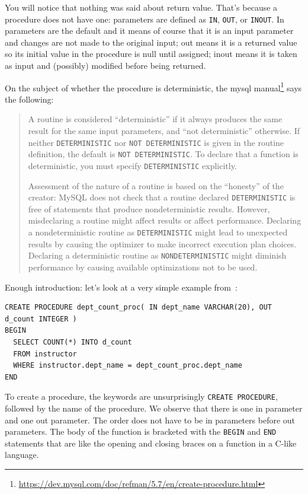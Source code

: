 You will notice that nothing was said about return value. That's because a procedure does not have one: parameters are defined as \texttt{IN}, \texttt{OUT}, or \texttt{INOUT}. In parameters are the default and it means of course that it is an input parameter and changes are not made to the original input; out means it is a returned value so its initial value in the procedure is null until assigned; inout means it is taken as input and (possibly) modified before being returned.

On the subject of whether the procedure is deterministic, the mysql manual\footnote{\url{https://dev.mysql.com/doc/refman/5.7/en/create-procedure.html}} says the following:

\begin{quote}
A routine is considered ``deterministic'' if it always produces the same result for the same input parameters, and ``not deterministic'' otherwise. If neither \texttt{DETERMINISTIC} nor \texttt{NOT DETERMINISTIC} is given in the routine definition, the default is \texttt{NOT DETERMINISTIC}. To declare that a function is deterministic, you must specify \texttt{DETERMINISTIC} explicitly.

Assessment of the nature of a routine is based on the ``honesty'' of the creator: MySQL does not check that a routine declared \texttt{DETERMINISTIC} is free of statements that produce nondeterministic results. However, misdeclaring a routine might affect results or affect performance. Declaring a nondeterministic routine as \texttt{DETERMINISTIC} might lead to unexpected results by causing the optimizer to make incorrect execution plan choices. Declaring a deterministic routine as \texttt{NONDETERMINISTIC} might diminish performance by causing available optimizations not to be used.
\end{quote}

Enough introduction: let's look at a very simple example from~\cite{dsc}:

{\small
\begin{verbatim}
CREATE PROCEDURE dept_count_proc( IN dept_name VARCHAR(20), OUT d_count INTEGER )
BEGIN
  SELECT COUNT(*) INTO d_count
  FROM instructor
  WHERE instructor.dept_name = dept_count_proc.dept_name
END
\end{verbatim}
}

To create a procedure, the keywords are unsurprisingly \texttt{CREATE PROCEDURE}, followed by the name of the procedure. We observe that there is one in parameter and one out parameter. The order does not have to be in parameters before out parameters. The body of the function is bracketed with the \texttt{BEGIN} and \texttt{END} statements that are like the opening and closing braces on a function in a C-like language.

